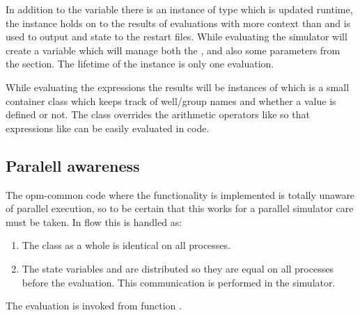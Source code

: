 In addition to the  variable there is an instance of
type  which is updated runtime, the 
instance holds on to the results of \udq{} evaluations with more context than
 and is used to output \udq{} and  state to the
restart files. While evaluating the simulator will create a 
variable which will manage both the ,
 and also some \udq{} parameters from the 
section. The lifetime of the  instance is only one \udq{}
evaluation.

While evaluating the \udq{} expressions the results will be instances of
 which is a small container class which keeps track of
well/group names and whether a value is defined or not. The 
class overrides the arithmetic operators like 
so that expressions like  can be easily evaluated in code.

\subsection*{Paralell awareness}
\label{udq_parallel}
The opm-common code where the \udq{} functionality is implemented is totally
unaware of parallel execution, so to be certain that this works for a parallel
simulator care must be taken. In flow this is handled as:
\begin{enumerate}
  \item The  class as a whole is identical on all
    processes.
  \item The state variables  and 
    are distributed so they are equal on all processes before the \udq{}
    evaluation. This communication is performed in the simulator.
\end{enumerate}
The \udq{} evaluation is invoked from
 function
.



